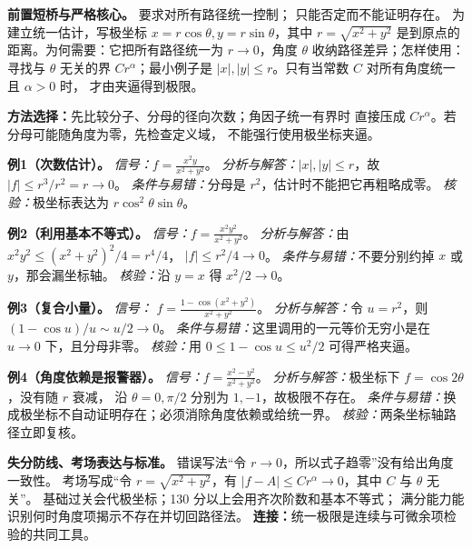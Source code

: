 
\begin{knowledgeBox}
\textbf{前置短桥与严格核心。}
要求对所有路径统一控制；
只能否定而不能证明存在。
为建立统一估计，写极坐标 \(x=r\cos\theta,y=r\sin\theta\)，其中
\(r=\sqrt{x^2+y^2}\) 是到原点的距离。为何需要：它把所有路径统一为
\(r\to0\)，角度 \(\theta\) 收纳路径差异；怎样使用：寻找与
\(\theta\) 无关的界 \(Cr^\alpha\)；最小例子是
\(|x|,|y|\le r\)。只有当常数 \(C\) 对所有角度统一且 \(\alpha>0\) 时，
才由夹逼得到极限。

\textbf{方法选择：}先比较分子、分母的径向次数；角因子统一有界时
直接压成 \(Cr^\alpha\)。若分母可能随角度为零，先检查定义域，
不能强行使用极坐标夹逼。

\textbf{例1（次数估计）。}
\emph{信号：}\(\displaystyle f=\frac{x^2y}{x^2+y^2}\)。
\emph{分析与解答：}\(|x|,|y|\le r\)，故
\(|f|\le r^3/r^2=r\to0\)。
\emph{条件与易错：}分母是 \(r^2\)，估计时不能把它再粗略成零。
\emph{核验：}极坐标表达为 \(r\cos^2\theta\sin\theta\)。

\textbf{例2（利用基本不等式）。}
\emph{信号：}\(\displaystyle f=\frac{x^2y^2}{x^2+y^2}\)。
\emph{分析与解答：}由 \(x^2y^2\le(x^2+y^2)^2/4=r^4/4\)，
\(|f|\le r^2/4\to0\)。
\emph{条件与易错：}不要分别约掉 \(x\) 或 \(y\)，那会漏坐标轴。
\emph{核验：}沿 \(y=x\) 得 \(x^2/2\to0\)。

\textbf{例3（复合小量）。}
\emph{信号：}
\(\displaystyle f=\frac{1-\cos(x^2+y^2)}{x^2+y^2}\)。
\emph{分析与解答：}令 \(u=r^2\)，则
\((1-\cos u)/u\sim u/2\to0\)。
\emph{条件与易错：}这里调用的一元等价无穷小是在 \(u\to0\) 下，且分母非零。
\emph{核验：}用 \(0\le1-\cos u\le u^2/2\) 可得严格夹逼。

\textbf{例4（角度依赖是报警器）。}
\emph{信号：}\(\displaystyle f=\frac{x^2-y^2}{x^2+y^2}\)。
\emph{分析与解答：}极坐标下 \(f=\cos2\theta\)，没有随 \(r\) 衰减，
沿 \(\theta=0,\pi/2\) 分别为 \(1,-1\)，故极限不存在。
\emph{条件与易错：}换成极坐标不自动证明存在；必须消除角度依赖或给统一界。
\emph{核验：}两条坐标轴路径立即复核。

\textbf{失分防线、考场表达与标准。}
错误写法“令 \(r\to0\)，所以式子趋零”没有给出角度一致性。
考场写成“令 \(r=\sqrt{x^2+y^2}\)，有
\(|f-A|\le Cr^\alpha\to0\)，其中 \(C\) 与 \(\theta\) 无关”。
基础过关会代极坐标；130 分以上会用齐次阶数和基本不等式；
满分能力能识别何时角度项揭示不存在并切回路径法。
\textbf{连接：}统一极限是连续与可微余项检验的共同工具。
\end{knowledgeBox}

